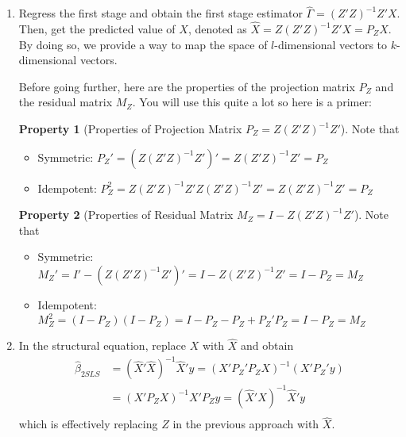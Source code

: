 \documentclass[12pt]{article}
\theoremstyle{definition}
\theoremstyle{property}
\newtheorem{property}{Property}[section]
\theoremstyle{assumption}
\theoremstyle{example}
\theoremstyle{comment}
\begin{document}
\begin{enumerate}
\item Regress the first stage and obtain the first stage estimator $\widehat{\Gamma}=(Z'Z)^{-1}Z'X$. Then, get the predicted value of $X$, denoted as $\widehat{X}=Z(Z'Z)^{-1}Z'X=P_ZX$. By doing so, we provide a way to map the space of $l$-dimensional vectors to $k$-dimensional vectors. 
\par
Before going further, here are the properties of the projection matrix $P_Z$ and the residual matrix $M_Z$. You will use this quite a lot so here is a primer:
\begin{mdframed}[backgroundcolor=green!5] 
\begin{property}[Properties of Projection Matrix $P_Z=Z(Z'Z)^{-1}Z'$] 
Note that
\begin{itemize} 
\item Symmetric: $P_Z'=(Z(Z'Z)^{-1}Z')'=Z(Z'Z)^{-1}Z'=P_Z$
\item Idempotent: $P_Z^2=Z(Z'Z)^{-1}Z'Z(Z'Z)^{-1}Z'=Z(Z'Z)^{-1}Z'=P_Z$
\end{itemize}
\end{property}
\end{mdframed}

\begin{mdframed}[backgroundcolor=green!5] 
\begin{property}[Properties of Residual Matrix $M_Z=I-Z(Z'Z)^{-1}Z'$] 
Note that
\begin{itemize} 
\item Symmetric: $M_Z'=I'-(Z(Z'Z)^{-1}Z')'=I-Z(Z'Z)^{-1}Z'=I-P_Z=M_Z$
\item Idempotent: $M_Z^2=(I-P_Z)(I-P_Z)=I-P_Z-P_Z+P_Z'P_Z=I-P_Z=M_Z$
\end{itemize}
\end{property}
\end{mdframed}
\item In the structural equation, replace $X$ with $\widehat{X}$ and obtain
\[
\begin{aligned}
\hat{\beta}_{2SLS}&=(\widehat{X}'\widehat{X})^{-1}\widehat{X}'y=(X'P_Z'P_ZX)^{-1}(X'P_Z'y)\\
&=(X'P_ZX)^{-1}X'P_Zy =(\widehat{X}'X)^{-1}\widehat{X}'y\\
\end{aligned}
\]
which is effectively replacing $Z$ in the previous approach with $\widehat{X}$. 
\end{enumerate}
\end{document}
